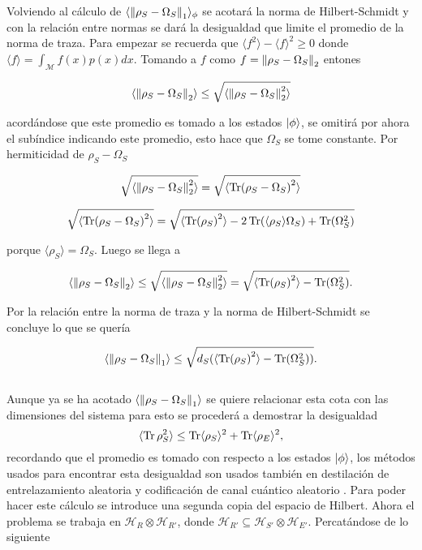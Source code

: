 Volviendo al cálculo de $\langle \norm{\rho_{S} -\Omega_{S}}_{1} \rangle_{\phi}$ se acotará la norma de Hilbert-Schmidt y con la relación entre normas se dará la desigualdad que limite el promedio de la norma de traza. Para empezar se recuerda que $ \langle f^{2} \rangle-\langle f \rangle^{2} \ge 0$ donde $\langle f \rangle = \int_{\mathcal{M}} f(x)p(x)dx$. Tomando a $f$ como $f= \norm{\rho_{S}-\Omega_{S}}_{2}$ entones

\begin{equation}
\langle \norm{ \rho_{S}-\Omega_{S} }_{2} \rangle \le \sqrt{ \langle \norm{ \rho_{S}-\Omega_{S} }_{2}^{2}\rangle}
\end{equation}

acordándose que este promedio es tomado a los estados $\ket{\phi}$, se omitirá por ahora el subíndice indicando este promedio, esto hace que $\Omega_{S}$ se tome constante. Por hermiticidad de $\rho_{S}-\Omega_{S}$ 

\begin{equation}
\sqrt{\langle \norm{ \rho_{S}-\Omega_{S} }_{2}^{2}\rangle} = \sqrt{\langle \Tr(\rho_{S}-\Omega_{S})^{2} \rangle}
\end{equation}

\begin{equation}
\sqrt{\langle \Tr( \rho_{S}-\Omega_{S})^{2} \rangle}= \sqrt{\langle \Tr(\rho_{S})^{2}\rangle -2 \Tr(\langle \rho_{S} \rangle \Omega_{S})+ \Tr(\Omega_{S}^{2}) }
\end{equation}

porque $\langle \rho_{S} \rangle=\Omega_{S}$. Luego se llega a

\begin{equation}
\langle \norm{ \rho_{S}-\Omega_{S} }_{2}\rangle \le \sqrt{\langle \norm{ \rho_{S}-\Omega_{S} }_{2}^{2}\rangle}= \sqrt{\langle \Tr(\rho_{S})^{2}\rangle - \Tr(\Omega_{S}^{2}) }.
\end{equation}

Por la relación entre la norma de traza y la norma de Hilbert-Schmidt se concluye lo que se quería

\begin{equation}
\langle \norm{ \rho_{S}-\Omega_{S} }_{1}\rangle \le \sqrt{d_{S}( \langle \Tr(\rho_{S})^{2}\rangle -\Tr(\Omega_{S}^{2}) ) }.
\end{equation}
\\
Aunque ya se ha acotado $\langle \norm{ \rho_{S}-\Omega_{S} }_{1}\rangle$ se quiere relacionar esta cota con las dimensiones del sistema para esto se procederá a demostrar la desigualdad
\begin{equation}
\langle \Tr \rho_{S}^{2} \rangle \le \Tr \langle \rho_{S} \rangle^{2} +\Tr \langle \rho_E \rangle^{2},
\end{equation}
recordando que el promedio es tomado con respecto a los estados $\ket{\phi}$, los métodos usados para encontrar esta desigualdad son usados también en destilación de entrelazamiento aleatoria y codificación de canal cuántico aleatorio \cite{QuantumDistilation}. Para poder hacer este cálculo se introduce una segunda copia del espacio de Hilbert. Ahora el problema se trabaja en $\mathcal{H}_{R} \otimes \mathcal{H}_{R'}$, donde $\mathcal{H}_{R'} \subseteq \mathcal{H}_{S'} \otimes \mathcal{H}_{E'}$.
Percatándose de lo siguiente

